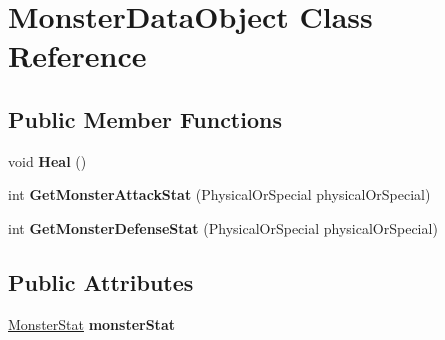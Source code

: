 \hypertarget{class_monster_data_object}{\section{Monster\-Data\-Object Class Reference}
\label{class_monster_data_object}
}
\subsection*{Public Member Functions}
\begin{DoxyCompactItemize}
\item 
\hypertarget{class_monster_data_object_ae98ad166b3e39dcf0dbb5f536bf26e75}{void {\bfseries Heal} ()}\label{class_monster_data_object_ae98ad166b3e39dcf0dbb5f536bf26e75}

\item 
\hypertarget{class_monster_data_object_a9145305fbb393ee4dc8c1b67fcad6761}{int {\bfseries Get\-Monster\-Attack\-Stat} (Physical\-Or\-Special physical\-Or\-Special)}\label{class_monster_data_object_a9145305fbb393ee4dc8c1b67fcad6761}

\item 
\hypertarget{class_monster_data_object_a587fff4654429213fd8d33df977b9be8}{int {\bfseries Get\-Monster\-Defense\-Stat} (Physical\-Or\-Special physical\-Or\-Special)}\label{class_monster_data_object_a587fff4654429213fd8d33df977b9be8}

\end{DoxyCompactItemize}
\subsection*{Public Attributes}
\begin{DoxyCompactItemize}
\item 
\hypertarget{class_monster_data_object_a32f219c168636419992aa379f59c9ff0}{\hyperlink{class_monster_stat}{Monster\-Stat} {\bfseries monster\-Stat}}\label{class_monster_data_object_a32f219c168636419992aa379f59c9ff0}

\end{DoxyCompactItemize}
